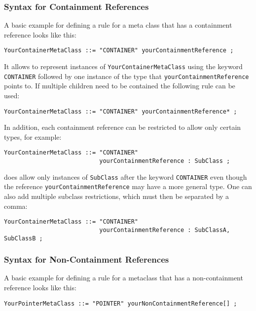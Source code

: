 \subsubsection{Syntax for Containment References}

A basic example for defining a rule for a meta class that has a containment 
reference looks like this:

\begin{lstlisting}
YourContainerMetaClass ::= "CONTAINER" yourContainmentReference ;
\end{lstlisting}

It allows to represent instances of \texttt{YourContainerMetaClass} using the
keyword \texttt{CONTAINER} followed by one instance of the type that
\texttt{yourContainmentReference} points to. If multiple children need to be
contained the following rule can be used:

\begin{lstlisting}
YourContainerMetaClass ::= "CONTAINER" yourContainmentReference* ;
\end{lstlisting}

In addition, each containment reference can be restricted to allow only certain 
types, for example:

\begin{lstlisting}
YourContainerMetaClass ::= "CONTAINER" 
                           yourContainmentReference : SubClass ;
\end{lstlisting}

does allow only instances of \texttt{SubClass} after the keyword
\texttt{CONTAINER} even though the reference \texttt{yourContainmentReference}
may have a more general type. One can also add multiple subclass restrictions,
which must then be separated by a comma:

\begin{lstlisting}
YourContainerMetaClass ::= "CONTAINER" 
                           yourContainmentReference : SubClassA, SubClassB ;
\end{lstlisting}

\subsubsection{Syntax for Non-Containment References}

A basic example for defining a rule for a metaclass that has a non-containment 
reference looks like this:

\begin{lstlisting}
YourPointerMetaClass ::= "POINTER" yourNonContainmentReference[] ;
\end{lstlisting}

